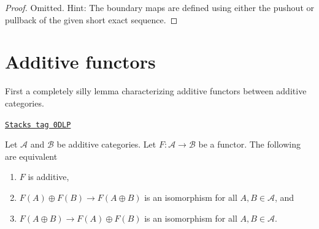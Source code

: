 \begin{proof}
Omitted. Hint: The boundary maps are defined using either the pushout
or pullback of the given short exact sequence.
\end{proof}

\section{Additive functors}
\label{homology-section-functors}
First a completely silly lemma characterizing additive functors
between additive categories.

\begin{lemma}
\label{homology-lemma-additive-functor}
\href{https://stacks.math.columbia.edu/tag/0DLP}{\texttt{Stacks tag 0DLP}}

Let $\mathcal{A}$ and $\mathcal{B}$ be additive categories.
Let $F : \mathcal{A} \to \mathcal{B}$ be a functor.
The following are equivalent
\begin{enumerate}
\item $F$ is additive,
\item $F(A) \oplus F(B) \to F(A \oplus B)$ is an isomorphism for
all $A, B \in \mathcal{A}$, and
\item $F(A \oplus B) \to F(A) \oplus F(B)$  is an isomorphism for
all $A, B \in \mathcal{A}$.
\end{enumerate}
\end{lemma}

